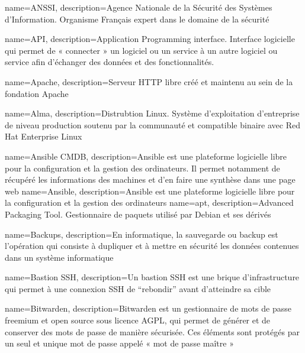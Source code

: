 {
    name=ANSSI,
    description={Agence Nationale de la Sécurité des Systèmes d'Information. Organisme Français expert dans le domaine de la sécurité}
}

{
    name=API,
    description={Application Programming interface. Interface logicielle qui permet de « connecter » un logiciel ou un service à un autre logiciel ou service afin d'échanger des données et des fonctionnalités.}
}

{
    name=Apache,
    description={Serveur HTTP libre créé et maintenu au sein de la fondation Apache}
}

{
    name=Alma,
    description={Distrubtion Linux. Système d'exploitation d'entreprise de niveau production soutenu par la communauté et compatible binaire avec Red Hat Enterprise Linux}
}

{
    name=Ansible CMDB,
    description={Ansible est une plateforme logicielle libre pour la configuration et la gestion des ordinateurs. Il permet notamment de récupéré les informations des machines et d'en faire une synthèse dans une page web}
}
{
    name=Ansible,
    description={Ansible est une plateforme logicielle libre pour la configuration et la gestion des ordinateurs}
}
{
    name=apt,
    description={Advanced Packaging Tool. Gestionnaire de paquets utilisé par Debian et ses dérivés}
}


{
    name=Backups,
    description={En informatique, la sauvegarde ou backup est l'opération qui consiste à dupliquer et à mettre en sécurité les données contenues dans un système informatique}
}

{
    name=Bastion SSH,
    description={Un bastion SSH est une brique d'infrastructure qui permet à une connexion SSH de “rebondir” avant d'atteindre sa cible}
}

{
    name=Bitwarden,
    description={Bitwarden est un gestionnaire de mots de passe freemium et open source sous licence AGPL, qui permet de générer et de conserver des mots de passe de manière sécurisée. Ces éléments sont protégés par un seul et unique mot de passe appelé « mot de passe maître »}
}

